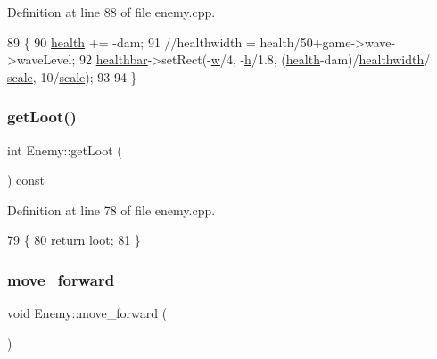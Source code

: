 Definition at line 88 of file enemy.\+cpp.


\begin{DoxyCode}
89 \{
90     \hyperlink{class_enemy_aedd5e7bf8ef07ee97be433c853a10d8d}{health} += -dam;
91     \textcolor{comment}{//healthwidth = health/50+game->wave->waveLevel;}
92     \hyperlink{class_enemy_ae2613608ff6c6d090a714874e722c340}{healthbar}->setRect(-\hyperlink{class_enemy_a259bfaab0f0d06c9ec2cb15c787e0b3a}{w}/4, -\hyperlink{class_enemy_adcb5512e63e735485cbb83f763acce75}{h}/1.8, (\hyperlink{class_enemy_aedd5e7bf8ef07ee97be433c853a10d8d}{health}-dam)/\hyperlink{class_enemy_aa5350ac40894832de19d669f0f65af4d}{healthwidth}/
      \hyperlink{class_enemy_a5c11ea6afd7998cf74a6a73dc05d0a63}{scale}, 10/\hyperlink{class_enemy_a5c11ea6afd7998cf74a6a73dc05d0a63}{scale});
93 
94 \}
\end{DoxyCode}
\mbox{\label{class_enemy_ab680828a4c84c33a66bea01178cdf3e3}} 
\subsubsection{\texorpdfstring{get\+Loot()}{getLoot()}}
{\footnotesize\ttfamily int Enemy\+::get\+Loot (\begin{DoxyParamCaption}{ }\end{DoxyParamCaption}) const}



Definition at line 78 of file enemy.\+cpp.


\begin{DoxyCode}
79 \{
80     \textcolor{keywordflow}{return} \hyperlink{class_enemy_a8f007e72b954c077e5433a111def78c3}{loot};
81 \}
\end{DoxyCode}
\mbox{\label{class_enemy_afa4cb14cbeaf872456d223cb8a314928}} 
\subsubsection{\texorpdfstring{move\+\_\+forward}{move\_forward}}
{\footnotesize\ttfamily void Enemy\+::move\+\_\+forward (\begin{DoxyParamCaption}{ }\end{DoxyParamCaption})\hspace{0.3cm}{\ttfamily [slot]}}



